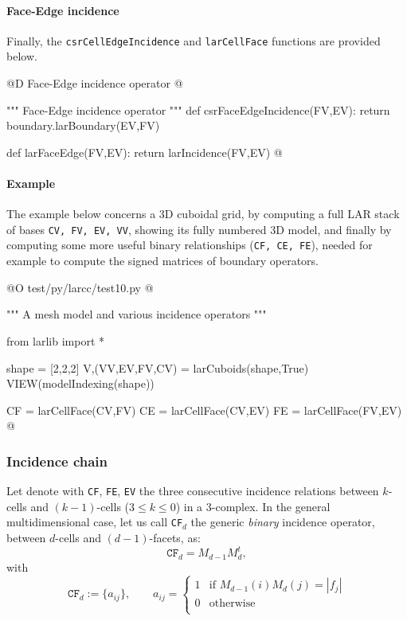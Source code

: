 \documentclass[11pt,oneside]{article}    %
\begin{document}
\paragraph{Face-Edge incidence}
Finally, the \texttt{csrCellEdgeIncidence} and \texttt{larCellFace} functions are provided below.

@D Face-Edge incidence operator
@{""" Face-Edge incidence operator """
def csrFaceEdgeIncidence(FV,EV):
    return boundary.larBoundary(EV,FV)

def larFaceEdge(FV,EV):
    return larIncidence(FV,EV)
@}


\paragraph{Example}
The example below concerns a 3D cuboidal grid, by computing a full LAR stack of bases
\texttt{CV, FV, EV, VV}, showing its fully numbered 3D model, and finally by computing
some more useful binary relationships (\texttt{CF, CE, FE}), needed for example to compute the signed matrices of boundary operators.

@O test/py/larcc/test10.py
@{""" A mesh model and various incidence operators """

from larlib import *

shape = [2,2,2]
V,(VV,EV,FV,CV) = larCuboids(shape,True)
VIEW(modelIndexing(shape))

CF = larCellFace(CV,FV)
CE = larCellFace(CV,EV)
FE = larCellFace(FV,EV)
@}

\subsubsection{Incidence chain}

Let denote with \texttt{CF}, \texttt{FE}, \texttt{EV} the three consecutive incidence relations between $k$-cells and $(k-1)$-cells ($3\leq k\leq 0$) in a 3-complex. In the general multidimensional case, let us call \texttt{CF}$_d$  the generic \emph{binary} incidence operator, between $d$-cells and $(d-1)$-facets, as:
\[
\texttt{CF}_d = M_{d-1} M_d^t, 
\]
with
\[
\texttt{CF}_d := \{a_{ij}\}, \qquad a_{ij} = 
\left\{
\begin{array}{cl}
1 & \mbox{if\ } M_{d-1}(i) M_d(j) = |f_j|  \\
0 & \mbox{otherwise}  \\  
\end{array}
\right.
\]
\end{document}
